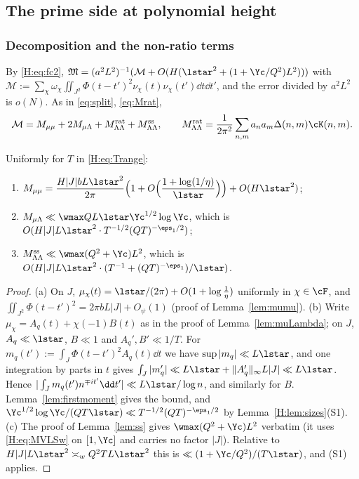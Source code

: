 \subsection{The prime side at polynomial height}\label{H:sec:prime}

\subsubsection*{Decomposition and the non-ratio terms}
By \eqref{H:eq:fc2}, $\mathfrak M=(a^2L^2)^{-1}(\mathcal M+O(H(\lstar^2+(1+\Yc/Q^2)L^2)))$ with $\mathcal M:=\sum_\chi\omega_\chi\iint_{J^2}\Phi(t-t')^2\nu_\chi(t)\nu_\chi(t')\dd t\dd t'$, and the error divided by $a^2L^2$ is $o(N)$. As in \eqref{eq:split}, \eqref{eq:Mrat},
\[
\mathcal M=M_{\mu\mu}+2M_{\mu\Lambda}+M^{\rm rat}_{\Lambda\Lambda}+M^{\rm ss}_{\Lambda\Lambda},\qquad M^{\rm rat}_{\Lambda\Lambda}=\frac1{2\pi^2}\sum_{n,m}a_na_m\Delta(n,m)\cK(n,m).
\]

\begin{lemma}\label{H:lem:arch}
Uniformly for $T$ in \eqref{H:eq:Trange}:
\begin{enumerate}
\item[(a)] $M_{\mu\mu}=\dfrac{H|J|bL\lstar^2}{2\pi}\Big(1+O\Big(\dfrac{1+\log(1/\eta)}{\lstar}\Big)\Big)+O(H\lstar^2)$;
\item[(b)] $M_{\mu\Lambda}\ll\wmax QL\lstar\Yc^{1/2}\log\Yc$, which is $O(H|J|L\lstar^2\cdot T^{-1/2}(QT)^{-\eps_1/2})$;
\item[(c)] $M^{\rm ss}_{\Lambda\Lambda}\ll\wmax(Q^2+\Yc)L^2$, which is $O(H|J|L\lstar^2\cdot(T^{-1}+(QT)^{-\eps_1})/\lstar)$.
\end{enumerate}
\end{lemma}
\begin{proof}
(a) On $J$, $\mu_\chi(t)=\lstar/(2\pi)+O(1+\log\frac1\eta)$ uniformly in $\chi\in\cF$, and $\iint_{J^2}\Phi(t-t')^2=2\pi bL|J|+O_\psi(1)$ (proof of Lemma~\ref{lem:mumu}).
(b) Write $\mu_\chi=A_q(t)+\chi(-1)B(t)$ as in the proof of Lemma~\ref{lem:muLambda}; on $J$, $A_q\ll\lstar$, $B\ll1$ and $A_q',B'\ll1/T$. For $m_q(t'):=\int_J\Phi(t-t')^2A_q(t)\dd t$ we have $\sup|m_q|\ll L\lstar$, and one integration by parts in $t$ gives $\int_J|m_q'|\ll L\lstar+\|A_q'\|_\infty L|J|\ll L\lstar$. Hence $|\int_Jm_q(t')n^{\mp it'}\dd t'|\ll L\lstar/\log n$, and similarly for $B$. Lemma~\ref{lem:firstmoment} gives the bound, and $\Yc^{1/2}\log\Yc/(QT\lstar)\ll T^{-1/2}(QT)^{-\eps_1/2}$ by Lemma~\ref{H:lem:sizes}(S1).
(c) The proof of Lemma~\ref{lem:ss} gives $\wmax(Q^2+\Yc)L^2$ verbatim (it uses \eqref{H:eq:MVLSw} on $[1,\Yc]$ and carries no factor $|J|$). Relative to $H|J|L\lstar^2\asymp_wQ^2TL\lstar^2$ this is $\ll(1+\Yc/Q^2)/(T\lstar)$, and (S1) applies.
\end{proof}

